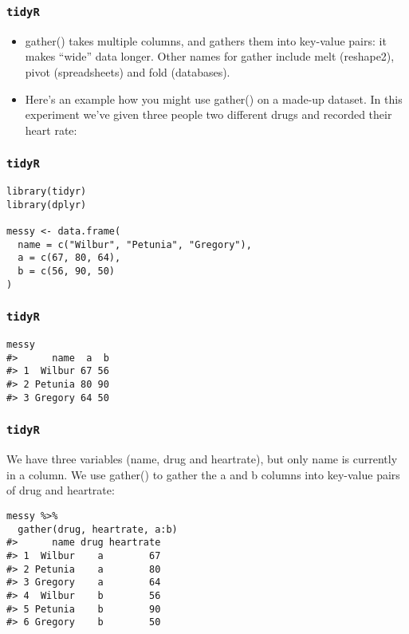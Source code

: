 \begin{frame}
\frametitle{\texttt{tidyR} }

\begin{itemize}
\item gather() takes multiple columns, and gathers them into key-value pairs: it makes “wide” data longer. Other names for gather include melt (reshape2), pivot (spreadsheets) and fold (databases). 
\item Here’s an example how you might use gather() on a made-up dataset. In this experiment we’ve given three people two different drugs and recorded their heart rate:
\end{itemize}


\end{frame}
\begin{frame}[fragile]
\frametitle{\texttt{tidyR} }

\begin{framed}
\begin{verbatim}
library(tidyr)
library(dplyr)

messy <- data.frame(
  name = c("Wilbur", "Petunia", "Gregory"),
  a = c(67, 80, 64),
  b = c(56, 90, 50)
)
\end{verbatim}
\end{framed}
\end{frame}
\begin{frame}[fragile]
\frametitle{\texttt{tidyR}}

\begin{framed}
\begin{verbatim}
messy
#>      name  a  b
#> 1  Wilbur 67 56
#> 2 Petunia 80 90
#> 3 Gregory 64 50
\end{verbatim}
\end{framed}

\end{frame}
\begin{frame}[fragile]
\frametitle{\texttt{tidyR} }

We have three variables (name, drug and heartrate), but only name is currently in a column. 
We use gather() to gather the a and b columns into key-value pairs of drug and heartrate:
\begin{framed}
\begin{verbatim}
messy %>%
  gather(drug, heartrate, a:b)
#>      name drug heartrate
#> 1  Wilbur    a        67
#> 2 Petunia    a        80
#> 3 Gregory    a        64
#> 4  Wilbur    b        56
#> 5 Petunia    b        90
#> 6 Gregory    b        50
\end{verbatim}
\end{framed}
\end{frame}
